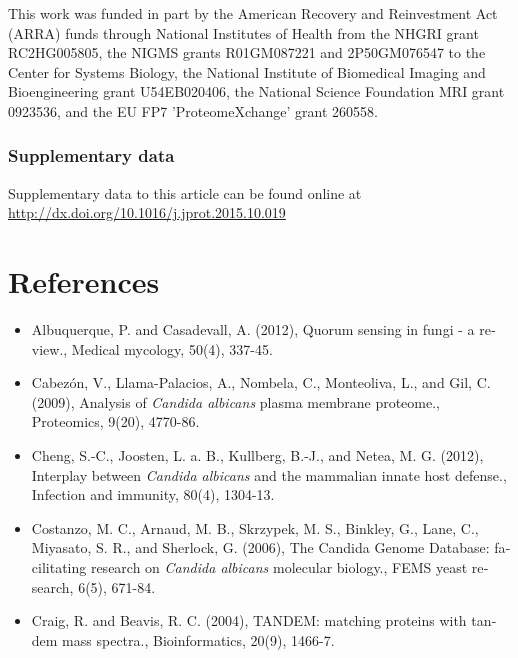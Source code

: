 \begin{otherlanguage}{british}
This work was funded in part by the American Recovery and Reinvestment Act (ARRA) 
funds through National Institutes of Health from the NHGRI grant RC2HG005805, the NIGMS
grants R01GM087221 and 2P50GM076547 to the Center for Systems Biology, the National 
Institute of Biomedical Imaging and Bioengineering grant U54EB020406, the National Science
Foundation MRI grant 0923536, and the EU FP7 'ProteomeXchange' grant 260558.

\subsubsection*{Supplementary data}
Supplementary data to this article can be found online at \newline
\href{http://dx.
doi.org/10.1016/j.jprot.2015.10.019}{http://dx.doi.org/10.1016/j.jprot.2015.10.019}


\section*{References}

\begin{itemize}[leftmargin=*]


\item[]{%
Albuquerque, P. and Casadevall, A. (2012), Quorum sensing in fungi - a review.,
Medical mycology, 50(4), 337-45.
}

\item[]{%
Cabez\'on, V., Llama-Palacios, A., Nombela, C., Monteoliva, L., and Gil, C. (2009), Analysis of
\textit{Candida albicans} plasma membrane proteome., Proteomics, 9(20), 4770-86.
}


\item[]{%
Cheng, S.-C., Joosten, L. a. B., Kullberg, B.-J., and Netea, M. G. (2012), Interplay between
\textit{Candida albicans} and the mammalian innate host defense., Infection and immunity, 80(4),
1304-13.
}

\item[]{%
Costanzo, M. C., Arnaud, M. B., Skrzypek, M. S., Binkley, G., Lane, C., Miyasato, S. R., and
Sherlock, G. (2006), The Candida Genome Database: facilitating research on 
\textit{Candida albicans} molecular biology., FEMS yeast research, 6(5), 671-84.
}

\item[]{%
Craig, R. and Beavis, R. C. (2004), TANDEM: matching proteins with tandem mass spectra.,
Bioinformatics, 20(9), 1466-7.
}


\end{itemize}
\end{otherlanguage}
